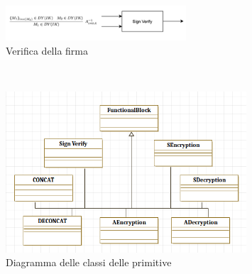 \begin{figure}[h!] 
    \centering 
        \includegraphics[width=0.6\textwidth]{../img/3.png} 
        \caption{Verifica della firma} 
\end{figure}\\
\begin{figure}[h!] 
    \centering 
        \includegraphics[width=0.8\textwidth]{../img/cd_1.png} 
        \caption{Diagramma delle classi delle primitive} 
\end{figure}\\
